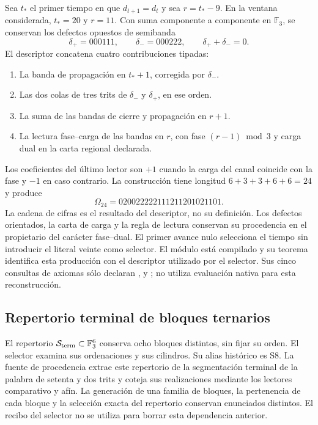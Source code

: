 \documentclass[11pt,a4paper]{article}
\newcommand{\F}{\mathbb F}
\begin{document}
Sea $t_*$ el primer tiempo en que $d_{t+1}=d_t$ y sea $r=t_*-9$.
En la ventana considerada, $t_*=20$ y $r=11$. Con suma componente a
componente en $\F_3$, se conservan los defectos opuestos de semibanda
\[
 \delta_+=000111,\qquad\delta_-=000222,\qquad
 \delta_++\delta_-=0.
\]
El descriptor concatena cuatro contribuciones tipadas:
\begin{enumerate}
\item La banda de propagación en $t_*+1$, corregida por $\delta_-$.
\item Las dos colas de tres trits de $\delta_-$ y $\delta_+$, en ese orden.
\item La suma de las bandas de cierre y propagación en $r+1$.
\item La lectura fase--carga de las bandas en $r$, con fase
$(r-1)\bmod3$ y carga dual en la carta regional declarada.
\end{enumerate}
Los coeficientes del último lector son $+1$ cuando la carga del canal
coincide con la fase y $-1$ en caso contrario. La construcción tiene
longitud $6+3+3+6+6=24$ y produce
\[
 \Omega_{24}=020022222111211201021101.
\]
La cadena de cifras es el resultado del descriptor, no su definición.
Los defectos orientados, la carta de carga y la regla de lectura conservan
su procedencia en el propietario del carácter fase--dual. El primer avance
nulo selecciona el tiempo sin introducir el literal veinte como selector.
El módulo  está compilado y su teorema
 identifica esta producción con el descriptor
utilizado por el selector. Sus cinco consultas de axiomas sólo declaran
,  y ; no utiliza
evaluación nativa para esta reconstrucción.

\subsection{Repertorio terminal de bloques ternarios}

El repertorio $\mathcal S_{\rm term}\subset\F_3^6$ conserva ocho bloques
distintos, sin fijar su orden. El selector examina sus ordenaciones y sus
cilindros. Su alias histórico es S8. La fuente de procedencia extrae este
repertorio de la segmentación terminal de la palabra de setenta y dos
trits y coteja sus realizaciones mediante los lectores comparativo y afín.
La generación de una familia de bloques, la pertenencia de cada bloque y
la selección exacta del repertorio conservan enunciados distintos. El
recibo del selector no se utiliza para borrar esta dependencia anterior.
\end{document}
